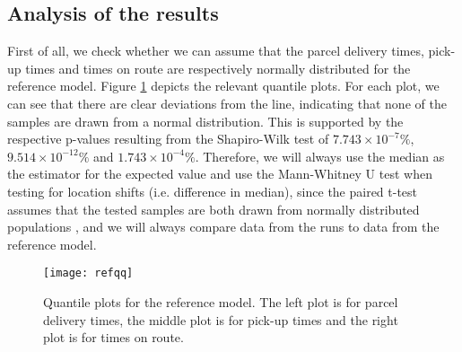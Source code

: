 \subsection{Analysis of the results}
First of all, we check whether we can assume that the parcel delivery times, pick-up times and times on route are respectively normally distributed for the reference model. Figure \ref{fig:refqq} depicts the relevant quantile plots. For each plot, we can see that there are clear deviations from the line, indicating that none of the samples are drawn from a normal distribution. This is supported by the respective p-values resulting from the Shapiro-Wilk test \cite{wiki:shapiro} of $7.743 \times 10^{-7}\%$, $9.514 \times 10^{-12} \%$ and $1.743 \times 10^{-4}\%$. Therefore, we will always use the median as the estimator for the expected value and use the Mann-Whitney U test \cite{wiki:mann-whitney} when testing for location shifts (i.e. difference in median), since the paired t-test assumes that the tested samples are both drawn from normally distributed populations \cite{wiki:ttest}, and we will always compare data from the runs to data from the reference model.

\begin{figure}[H]
    \centering
    \texttt{[image: refqq]}
    \caption{Quantile plots for the reference model. The left plot is for parcel delivery times, the middle plot is for pick-up times and the right plot is for times on route.}
    \label{fig:refqq}
\end{figure}

